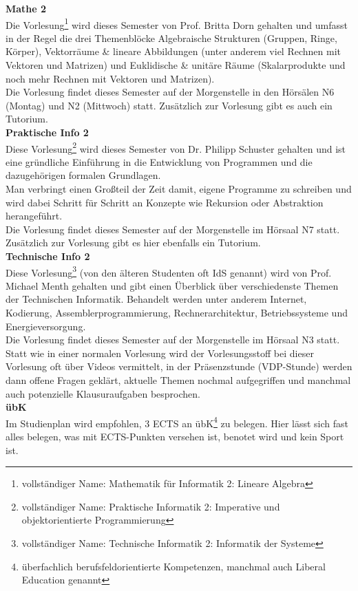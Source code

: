 
\pagebreak

\textbf{Mathe 2}\\[4mm]
Die Vorlesung\footnote{vollständiger Name: Mathematik für Informatik 2: Lineare Algebra} wird dieses Semester von Prof. Britta Dorn gehalten und umfasst in der Regel die drei Themenblöcke Algebraische Strukturen (Gruppen, Ringe, Körper), Vektorräume \& lineare Abbildungen (unter anderem viel Rechnen mit Vektoren und Matrizen) und Euklidische \& unitäre Räume (Skalarprodukte und noch mehr Rechnen mit Vektoren und Matrizen).\\
Die Vorlesung findet dieses Semester auf der Morgenstelle in den Hörsälen N6 (Montag) und N2 (Mittwoch) statt. Zusätzlich zur Vorlesung gibt es auch ein Tutorium.\\

\textbf{Praktische Info 2}\\[4mm]
Diese Vorlesung\footnote{vollständiger Name: Praktische Informatik 2: Imperative und objektorientierte Programmierung} wird dieses Semester von Dr. Philipp Schuster gehalten und ist eine gründliche Einführung in die Entwicklung von Programmen und die dazugehörigen formalen Grundlagen.\\
Man verbringt einen Großteil der Zeit damit, eigene Programme zu schreiben und wird
dabei Schritt für Schritt an Konzepte wie Rekursion oder Abstraktion herangeführt.\\
Die Vorlesung findet dieses Semester auf der Morgenstelle im Hörsaal N7 statt. Zusätzlich zur Vorlesung gibt es hier ebenfalls ein Tutorium.\\

\textbf{Technische Info 2}\\[4mm]
Diese Vorlesung\footnote{vollständiger Name: Technische Informatik 2: Informatik der Systeme} (von den älteren Studenten oft IdS genannt) wird von Prof. Michael Menth gehalten und gibt einen Überblick über verschiedenste Themen der Technischen Informatik. Behandelt werden unter anderem Internet, Kodierung, Assemblerprogrammierung, Rechnerarchitektur, Betriebssysteme und Energieversorgung.\\
Die Vorlesung findet dieses Semester auf der Morgenstelle im Hörsaal N3 statt. Statt wie in einer normalen Vorlesung wird der Vorlesungsstoff bei dieser Vorlesung oft über Videos vermittelt, in der Präsenzstunde (VDP-Stunde) werden dann offene Fragen geklärt, aktuelle Themen nochmal aufgegriffen und manchmal auch potenzielle Klausuraufgaben besprochen.\\

\textbf{übK}\\[4mm]
Im Studienplan wird empfohlen, 3 ECTS an übK\footnote{überfachlich berufsfeldorientierte Kompetenzen, manchmal auch Liberal Education genannt} zu belegen. Hier lässt sich fast alles belegen, was mit ECTS-Punkten versehen ist, benotet wird und kein Sport ist.

\newpage
\normalsize


